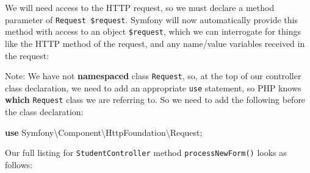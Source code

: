 \documentclass[a4paperpaper,openright]{book}
\newenvironment{Shaded}{}{}
\newcommand{\KeywordTok}[1]{\textcolor[rgb]{0.00,0.44,0.13}{\textbf{#1}}}
\newcommand{\NormalTok}[1]{#1}
\newcommand{\OtherTok}[1]{\textcolor[rgb]{0.00,0.44,0.13}{#1}}
\newcommand{\StringTok}[1]{\textcolor[rgb]{0.25,0.44,0.63}{#1}}
\begin{document}
\begin{Shaded}
\end{Shaded}

We will need access to the HTTP request, so we must declare a method
parameter of \texttt{Request\ \$request}. Symfony will now automatically
provide this method with access to an object \texttt{\$request}, which
we can interrogate for things like the HTTP method of the request, and
any name/value variables received in the request:

\begin{Shaded}
\end{Shaded}

Note: We have not \textbf{namespaced} class \texttt{Request}, so, at the
top of our controller class declaration, we need to add an appropriate
\texttt{use} statement, so PHP knows \textbf{which} \texttt{Request}
class we are referring to. So we need to add the following before the
class declaration:

\begin{Shaded}
\begin{Highlighting}[]
    \KeywordTok{use}\NormalTok{ Symfony\textbackslash{}Component\textbackslash{}HttpFoundation\textbackslash{}Request}\OtherTok{;}
\end{Highlighting}
\end{Shaded}

Our full listing for \texttt{StudentController} method
\texttt{processNewForm()} looks as follows:
\end{document}

